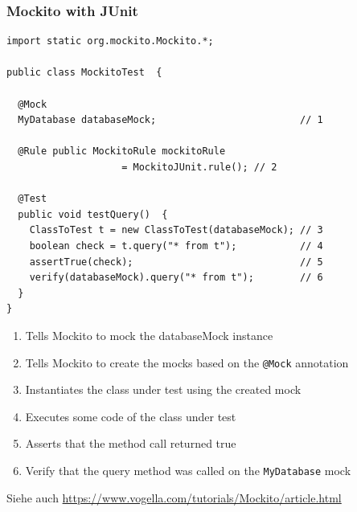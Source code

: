 
\begin{frame}
 \frametitle{Mockito with JUnit}
\footnotesize
\lstset{language=Java}
\begin{lstlisting}[frame=single]
import static org.mockito.Mockito.*;

public class MockitoTest  {

  @Mock
  MyDatabase databaseMock;                         // 1

  @Rule public MockitoRule mockitoRule
		            = MockitoJUnit.rule(); // 2

  @Test
  public void testQuery()  {
    ClassToTest t = new ClassToTest(databaseMock); // 3
    boolean check = t.query("* from t");           // 4
    assertTrue(check);                             // 5
    verify(databaseMock).query("* from t");        // 6
  }
}
\end{lstlisting}
\newpage
\normalsize
\begin{enumerate}
	\item Tells Mockito to mock the databaseMock instance
	\item Tells Mockito to create the mocks based on the \texttt{@Mock} annotation
	\item Instantiates the class under test using the created mock
	\item Executes some code of the class under test
	\item Asserts that the method call returned true
	\item Verify that the query method was called on the \texttt{MyDatabase} mock
\end{enumerate}

Siehe auch \url{https://www.vogella.com/tutorials/Mockito/article.html}
\end{frame}


